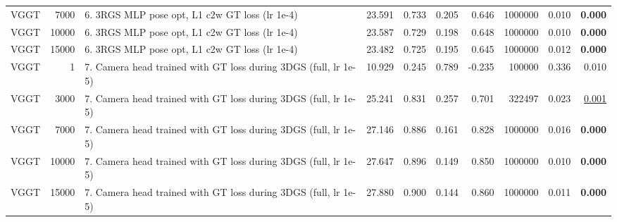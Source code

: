 \begin{table}[H]
\begin{tabular}{lrlrrrrrrr}
VGGT & 7000 & 6. 3RGS MLP pose opt, L1 c2w GT loss (lr 1e-4) & 23.591 & 0.733 & 0.205 & 0.646 & 1000000 & 0.010 & \textbf{0.000} \\
VGGT & 10000 & 6. 3RGS MLP pose opt, L1 c2w GT loss (lr 1e-4) & 23.587 & 0.729 & 0.198 & 0.648 & 1000000 & 0.010 & \textbf{0.000} \\
VGGT & 15000 & 6. 3RGS MLP pose opt, L1 c2w GT loss (lr 1e-4) & 23.482 & 0.725 & 0.195 & 0.645 & 1000000 & 0.012 & \textbf{0.000} \\
VGGT & 1 & 7. Camera head trained with GT loss during 3DGS (full, lr 1e-5) & 10.929 & 0.245 & 0.789 & -0.235 & 100000 & 0.336 & 0.010 \\
VGGT & 3000 & 7. Camera head trained with GT loss during 3DGS (full, lr 1e-5) & 25.241 & 0.831 & 0.257 & 0.701 & 322497 & 0.023 & \underline{0.001} \\
VGGT & 7000 & 7. Camera head trained with GT loss during 3DGS (full, lr 1e-5) & 27.146 & 0.886 & 0.161 & 0.828 & 1000000 & 0.016 & \textbf{0.000} \\
VGGT & 10000 & 7. Camera head trained with GT loss during 3DGS (full, lr 1e-5) & 27.647 & 0.896 & 0.149 & 0.850 & 1000000 & 0.010 & \textbf{0.000} \\
VGGT & 15000 & 7. Camera head trained with GT loss during 3DGS (full, lr 1e-5) & 27.880 & 0.900 & 0.144 & 0.860 & 1000000 & 0.011 & \textbf{0.000} \\
\bottomrule
\end{tabular}
\end{table}